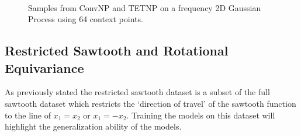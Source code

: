 \documentclass[../../main.tex]{subfiles}
\begin{document}
\begin{figure}[H]
	\centering
	\\
	\caption{Samples from ConvNP and TETNP on a frequency 2D Gaussian Process using 64 context points.}
	\label{fig:high-freq-2d-gps}
\end{figure}

\subsection{Restricted Sawtooth and Rotational Equivariance}

As previously stated the restricted sawtooth dataset is a subset of the full sawtooth dataset which restricts the `direction of travel' of the sawtooth function to the line of $x_1 = x_2$ or $x_1 = -x_2$. Training the models on this dataset will highlight the generalization ability of the models.
\end{document}
